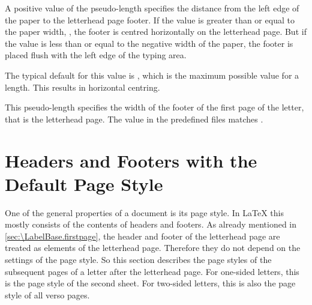 \begin{Declaration}
\end{Declaration}
%
A positive value of the 
pseudo-length specifies the distance from the left edge of the paper to the
letterhead page footer. If the value is greater than or equal to the paper
width, , the footer is centred
horizontally on the letterhead page. But if the value is less than or equal to
the negative width of the paper, the footer is placed flush with the left edge
of the typing area.

The typical default for this value is ,
which is the maximum possible value for a length. This results in horizontal
centring.%
\EndIndexGroup


\begin{Declaration}
\end{Declaration}
This pseudo-length specifies the width of the footer of the first page of the
letter, that is the letterhead page. The value in the predefined 
files matches
%
.%
%
\EndIndexGroup
%
\EndIndexGroup
%
\EndIndexGroup




\section{Headers and Footers with the Default Page Style}
\BeginIndexGroup
{}%
%
%

One of the general properties of a document is its page style. In \LaTeX{}
this mostly consists of the contents of headers and footers.
As already mentioned in
\autoref{sec:\LabelBase.firstpage}, the header and footer of the letterhead
page are treated as elements of the letterhead page. Therefore they do not
depend on the settings of the page style. So this section describes the page
styles of the subsequent pages of a letter after the letterhead page. For
one-sided letters, this is the page style of the second sheet. For two-sided
letters, this is also the page style of all verso pages.


